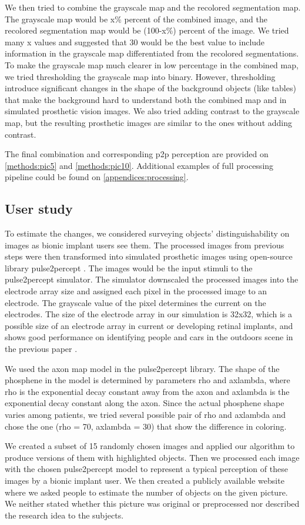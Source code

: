 We then tried to combine the grayscale map and the recolored segmentation map. The grayscale map would be x\% percent of the combined image, and the recolored segmentation map would be (100-x\%) percent of the image. We tried many x values and suggested that 30 would be the best value to include information in the grayscale map differentiated from the recolored segmentations.
To make the grayscale map much clearer in low percentage in the combined map, we tried thresholding the grayscale map into binary. However, thresholding introduce significant changes in the shape of the background objects (like tables) that make the background hard to understand both the combined map and in simulated prosthetic vision images. We also tried adding contrast to the grayscale map, but the resulting prosthetic images are similar to the ones without adding contrast.

The final combination and corresponding p2p perception are provided on \autoref{methods:pic5} and \autoref{methods:pic10}. Additional examples of full processing pipeline could be found on \autoref{appendices:processing}.

\subsection{User study}
\label{methods:survey}

To estimate the changes, we considered surveying objects' distinguishability on images as bionic implant users see them. 
The processed images from previous steps were then transformed into simulated prosthetic images using open-source library pulse2percept \cite{Beyeler148015}. The images would be the input stimuli to the pulse2percept simulator. The simulator downscaled the processed images into the electrode array size and assigned each pixel in the processed image to an electrode. The grayscale value of the pixel determines the current on the electrodes. The size of the electrode array in our simulation is 32x32, which is a possible size of an electrode array in current or developing retinal implants, and shows good performance on identifying people and cars in the outdoors scene in the previous paper \cite{han2021deep}.

We used the axon map model in the pulse2percept library. The shape of the phosphene in the model is determined by parameters rho and axlambda, where rho is the exponential decay constant away from the axon and axlambda is the exponential decay constant along the axon. Since the actual phosphene shape varies among patients, we tried several possible pair of rho and axlambda and chose the one (rho = 70, axlambda = 30) that show the difference in coloring.

We created a subset of 15 randomly chosen images and applied our algorithm to produce versions of them with highlighted objects. Then we processed each image with the chosen pulse2percept model to represent a typical perception of these images by a bionic implant user. We then created a publicly available website where we asked people to estimate the number of objects on the given picture. We neither stated whether this picture was original or preprocessed nor described the research idea to the subjects. 